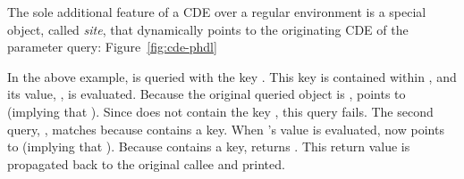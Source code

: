 The sole additional feature of a CDE over a regular environment is a special object, called \emph{site}, that dynamically points to the originating CDE of the parameter query:
Figure~\ref{fig:cde-phdl}




In the above example,  is queried with the key . 
This key is contained within , and its value, , is evaluated. 
Because the original queried object is ,  points to  (implying that ). 
Since  does not contain the key , this query fails.
The second query, , matches because  contains a  key. 
When 's value is evaluated,  now points to  (implying that ). 
Because  contains a  key,  returns . 
This return value is propagated back to the original  callee and printed.

